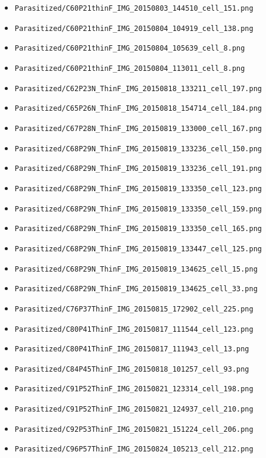 \begin{itemize}
\item \texttt{Parasitized/C60P21thinF\_IMG\_20150803\_144510\_cell\_151.png}
\item \texttt{Parasitized/C60P21thinF\_IMG\_20150804\_104919\_cell\_138.png}
\item \texttt{Parasitized/C60P21thinF\_IMG\_20150804\_105639\_cell\_8.png}
\item \texttt{Parasitized/C60P21thinF\_IMG\_20150804\_113011\_cell\_8.png}
\item \texttt{Parasitized/C62P23N\_ThinF\_IMG\_20150818\_133211\_cell\_197.png}
\item \texttt{Parasitized/C65P26N\_ThinF\_IMG\_20150818\_154714\_cell\_184.png}
\item \texttt{Parasitized/C67P28N\_ThinF\_IMG\_20150819\_133000\_cell\_167.png}
\item \texttt{Parasitized/C68P29N\_ThinF\_IMG\_20150819\_133236\_cell\_150.png}
\item \texttt{Parasitized/C68P29N\_ThinF\_IMG\_20150819\_133236\_cell\_191.png}
\item \texttt{Parasitized/C68P29N\_ThinF\_IMG\_20150819\_133350\_cell\_123.png}
\item \texttt{Parasitized/C68P29N\_ThinF\_IMG\_20150819\_133350\_cell\_159.png}
\item \texttt{Parasitized/C68P29N\_ThinF\_IMG\_20150819\_133350\_cell\_165.png}
\item \texttt{Parasitized/C68P29N\_ThinF\_IMG\_20150819\_133447\_cell\_125.png}
\item \texttt{Parasitized/C68P29N\_ThinF\_IMG\_20150819\_134625\_cell\_15.png}
\item \texttt{Parasitized/C68P29N\_ThinF\_IMG\_20150819\_134625\_cell\_33.png}
\item \texttt{Parasitized/C76P37ThinF\_IMG\_20150815\_172902\_cell\_225.png}
\item \texttt{Parasitized/C80P41ThinF\_IMG\_20150817\_111544\_cell\_123.png}
\item \texttt{Parasitized/C80P41ThinF\_IMG\_20150817\_111943\_cell\_13.png}
\item \texttt{Parasitized/C84P45ThinF\_IMG\_20150818\_101257\_cell\_93.png}
\item \texttt{Parasitized/C91P52ThinF\_IMG\_20150821\_123314\_cell\_198.png}
\item \texttt{Parasitized/C91P52ThinF\_IMG\_20150821\_124937\_cell\_210.png}
\item \texttt{Parasitized/C92P53ThinF\_IMG\_20150821\_151224\_cell\_206.png}
\item \texttt{Parasitized/C96P57ThinF\_IMG\_20150824\_105213\_cell\_212.png}

\end{itemize}
